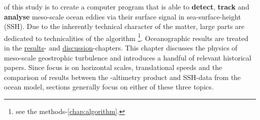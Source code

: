   of this study is to create a computer program that is able to \textbf{detect}, \textbf{track} and \textbf{analyse} meso-scale ocean eddies via their surface signal in sea-surface-height (SSH). Due to the inherently technical character of the matter, large parts are dedicated to technicalities of the algorithm \footnote{see the methods-\cref{chap:algorithm}.}. Oceanographic results are treated in the \href{chap:results}{results}- and \href{chap:discussion}{discussion}-chapters. This chapter discusses the physics of meso-scale geostrophic turbulence and introduces a handful of relevant historical papers. Since focus is on horizontal scales, translational speeds and the comparison of results between the \AVI-altimetry product and SSH-data from the \POP ocean model, sections generally focus on either of these three topics.
